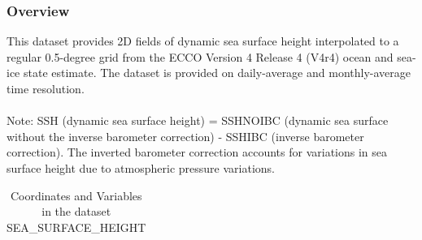 \subsubsection{Overview}
This dataset provides 2D fields of dynamic sea surface height interpolated to a regular 0.5-degree grid from the ECCO Version 4 Release 4 (V4r4) ocean and sea-ice state estimate. The dataset is provided on daily-average and monthly-average time resolution.
\\\\
Note: SSH (dynamic sea surface height) = SSHNOIBC (dynamic sea surface without the inverse barometer correction) - SSHIBC (inverse barometer correction). The inverted barometer correction accounts for variations in sea surface height due to atmospheric pressure variations.
\\
\begin{longtable}{|m{}|m{}|m{}|}
\caption{Coordinates and Variables in the dataset SEA\_SURFACE\_HEIGHT}
\label{tab:table-<xarray.Dataset> Size: 3MB
Dimensions:         (time: 1, latitude: 360, longitude: 720, nv: 2)
Coordinates:
  * time            (time) datetime64[ns] 8B 2017-12-29T12:00:00
  * latitude        (latitude) float32 1kB -89.75 -89.25 -88.75 ... 89.25 89.75
  * longitude       (longitude) float32 3kB -179.8 -179.2 -178.8 ... 179.2 179.8
    time_bnds       (time, nv) datetime64[ns] 16B ...
    latitude_bnds   (latitude, nv) float32 3kB ...
    longitude_bnds  (longitude, nv) float32 6kB ...
Dimensions without coordinates: nv
Data variables:
    SSH             (time, latitude, longitude) float32 1MB ...
    SSHIBC          (time, latitude, longitude) float32 1MB ...
    SSHNOIBC        (time, latitude, longitude) float32 1MB ...
Attributes: (12/57)
    acknowledgement:              This research was carried out by the Jet Pr...
    author:                       Ian Fenty and Ou Wang
    cdm_data_type:                Grid
    comment:                      Fields provided on a regular lat-lon grid. ...
    Conventions:                  CF-1.8, ACDD-1.3
    coordinates_comment:          Note: the global 'coordinates' attribute de...
    ...                           ...
    time_coverage_duration:       P1D
    time_coverage_end:            2017-12-30T00:00:00
    time_coverage_resolution:     P1D
    time_coverage_start:          2017-12-29T00:00:00
    title:                        ECCO Sea Surface Height - Daily Mean 0.5 De...
    uuid:                         7beb77e0-404a-11eb-8bf7-0cc47a3f891b-fields} \\ 

\end{longtable}
